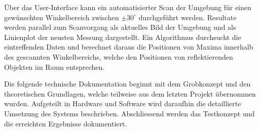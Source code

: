 Über das User-Interface kann ein automatisierter Scan der Umgebung für einen gewünschten Winkelbereich zwischen $\pm 30^{\circ}$ durchgeführt werden. Resultate werden parallel zum Scanvorgang als aktuelles Bild der Umgebung und als Linienplot der neusten Messung dargestellt. Ein Algorithmus durchsucht die eintreffenden Daten und berechnet daraus die Positionen von Maxima innerhalb des gescannten Winkelbereichs, welche den Positionen von reflektierenden Objekten im Raum entsprechen.

Die folgende technische Dokumentation beginnt mit dem Grobkonzept und den theoretischen Grundlagen, welche teilweise aus dem letzten Projekt übernommen wurden. Aufgeteilt in Hardware und Software wird daraufhin die detaillierte Umsetzung des Systems beschrieben. Ab\-schliessend werden das Testkonzept und die erreichten Ergebnisse dokumentiert.
